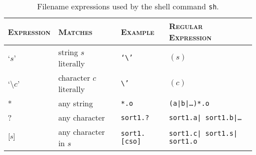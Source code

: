 \begin{table}[!ht]
    \centering
    \begin{tabularx}{\textwidth}{X|X|X|X}
        \hline
        \hline
        \textsc{Expression} & \textsc{Matches} & \textsc{Example} & \textsc{Regular Expression} \\
        \hline
        `$s$' & string $s$ literally & \texttt{`\textbackslash'} & $(s)$ \\
        `\textbackslash$c$' & character $c$ literally & \texttt{\textbackslash'} & $(c)$ \\
        * & any string & \texttt{*.o} & \texttt{(a|b|\dots)*.o} \\
        ? & any character & \texttt{sort1.?} & \texttt{sort1.a| sort1.b|\dots} \\
        $\left[ s \right]$ & any character in $s$ & \texttt{sort1.[cso]} & \texttt{sort1.c| sort1.s| sort1.o} \\
        \hline
    \end{tabularx}
    \caption{Filename expressions used by the shell command \texttt{sh}.}
    \label{tab:030311}
\end{table}